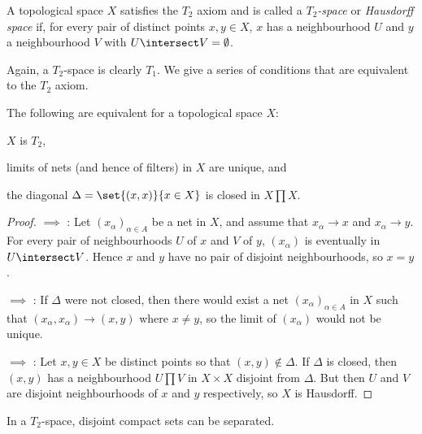 \documentclass[article, a4paper, 11pt, oneside]{memoir}
\numberwithin{equation}{chapter}
\begin{document}
\begin{definition}
    A topological space $X$ satisfies the $T_2$ axiom and is called a \emph{$T_2$-space} or \emph{Hausdorff space} if, for every pair of distinct points $x,y \in X$, $x$ has a neighbourhood $U$ and $y$ a neighbourhood $V$ with $U \intersect V = \emptyset$.
\end{definition}
%
Again, a $T_2$-space is clearly $T_1$. We give a series of conditions that are equivalent to the $T_2$ axiom.


\begin{proposition}
    The following are equivalent for a topological space $X$:
    \begin{enumprop}
        \item \label{enum:T2-space} $X$ is $T_2$,
        \item \label{enum:T2-limits_unique} limits of nets (and hence of filters) in $X$ are unique, and
        \item \label{enum:T2-closed_diagonal} the diagonal $\Delta = \set{(x,x)}{x \in X}$ is closed in $X \prod X$.
    \end{enumprop}
\end{proposition}

\begin{proof}
     $\implies$ : Let $(x_\alpha)_{\alpha \in A}$ be a net in $X$, and assume that $x_\alpha \to x$ and $x_\alpha \to y$. For every pair of neighbourhoods $U$ of $x$ and $V$ of $y$, $(x_\alpha)$ is eventually in $U \intersect V$. Hence $x$ and $y$ have no pair of disjoint neighbourhoods, so $x = y$.

     $\implies$ : If $\Delta$ were not closed, then there would exist a net $(x_\alpha)_{\alpha \in A}$ in $X$ such that $(x_\alpha, x_\alpha) \to (x,y)$ where $x \neq y$, so the limit of $(x_\alpha)$ would not be unique.

     $\implies$ : Let $x,y \in X$ be distinct points so that $(x,y) \not\in \Delta$. If $\Delta$ is closed, then $(x,y)$ has a neighbourhood $U \prod V$ in $X \times X$ disjoint from $\Delta$. But then $U$ and $V$ are disjoint neighbourhoods of $x$ and $y$ respectively, so $X$ is Hausdorff.
\end{proof}




\begin{proposition}
    In a $T_2$-space, disjoint compact sets can be separated.
\end{proposition}
\end{document}
